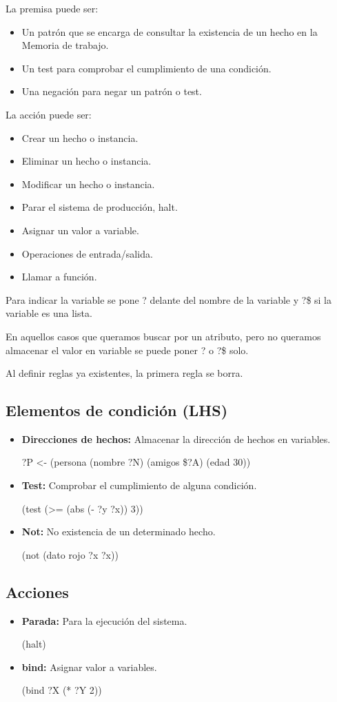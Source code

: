 \documentclass[12pt, twoside, openright]{report} %
\begin{document}
La premisa puede ser:
\begin{itemize}
	\item Un patrón que se encarga de consultar la existencia de un hecho en la Memoria de trabajo.
	\item Un test para comprobar el cumplimiento de una condición.
	\item Una negación para negar un patrón o test.
\end{itemize}

La acción puede ser:
\begin{itemize}
	\item Crear un hecho o instancia.
	\item Eliminar un hecho o instancia.
	\item Modificar un hecho o instancia.
	\item Parar el sistema de producción, halt.
	\item Asignar un valor a variable.
	\item Operaciones de entrada/salida.
	\item Llamar a función.
\end{itemize}

Para indicar la variable se pone ? delante del nombre de la variable y ?\$ si la variable es una lista.

En aquellos casos que queramos buscar por un atributo, pero no queramos almacenar el valor en variable se puede poner ? o ?\$ solo.

Al definir reglas ya existentes, la primera regla se borra.
\subsection{Elementos de condición (LHS)}
\begin{itemize}
	\item \textbf{Direcciones de hechos:} Almacenar la dirección de hechos en variables.

	      ?P <- (persona (nombre ?N) (amigos \$?A) (edad 30))
	\item \textbf{Test:} Comprobar el cumplimiento de alguna condición.

	      (test (>= (abs (- ?y ?x)) 3))
	\item \textbf{Not:} No existencia de un determinado hecho.

	      (not (dato rojo ?x ?x))
\end{itemize}

\subsection{Acciones}
\begin{itemize}
	\item \textbf{Parada:} Para la ejecución del sistema.

	      (halt)
	\item \textbf{bind:} Asignar valor a variables.

	      (bind ?X (* ?Y 2))
\end{itemize}
\end{document}
